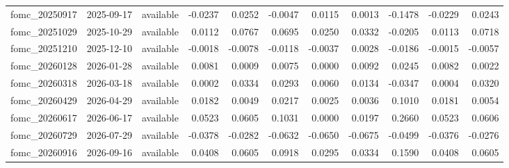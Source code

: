 \begin{tabular}{lllrrrrrrrr}
fomc_20250917 & 2025-09-17 & available & -0.0237 & 0.0252 & -0.0047 & 0.0115 & 0.0013 & -0.1478 & -0.0229 & 0.0243 \\
fomc_20251029 & 2025-10-29 & available & 0.0112 & 0.0767 & 0.0695 & 0.0250 & 0.0332 & -0.0205 & 0.0113 & 0.0718 \\
fomc_20251210 & 2025-12-10 & available & -0.0018 & -0.0078 & -0.0118 & -0.0037 & 0.0028 & -0.0186 & -0.0015 & -0.0057 \\
fomc_20260128 & 2026-01-28 & available & 0.0081 & 0.0009 & 0.0075 & 0.0000 & 0.0092 & 0.0245 & 0.0082 & 0.0022 \\
fomc_20260318 & 2026-03-18 & available & 0.0002 & 0.0334 & 0.0293 & 0.0060 & 0.0134 & -0.0347 & 0.0004 & 0.0320 \\
fomc_20260429 & 2026-04-29 & available & 0.0182 & 0.0049 & 0.0217 & 0.0025 & 0.0036 & 0.1010 & 0.0181 & 0.0054 \\
fomc_20260617 & 2026-06-17 & available & 0.0523 & 0.0605 & 0.1031 & 0.0000 & 0.0197 & 0.2660 & 0.0523 & 0.0606 \\
fomc_20260729 & 2026-07-29 & available & -0.0378 & -0.0282 & -0.0632 & -0.0650 & -0.0675 & -0.0499 & -0.0376 & -0.0276 \\
fomc_20260916 & 2026-09-16 & available & 0.0408 & 0.0605 & 0.0918 & 0.0295 & 0.0334 & 0.1590 & 0.0408 & 0.0605 \\
\bottomrule
\end{tabular}
